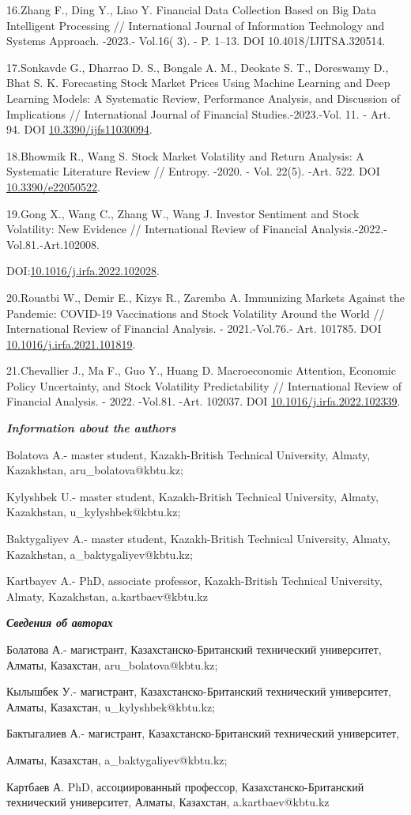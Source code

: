 \documentclass[
]{article}
\begin{document}
16.Zhang F., Ding Y., Liao Y. Financial Data Collection Based on Big
Data Intelligent Processing // International Journal of Information
Technology and Systems Approach. -2023.- Vol.16( 3). - P. 1--13. DOI
10.4018/IJITSA.320514.

17.Sonkavde G., Dharrao D. S., Bongale A. M., Deokate S. T., Doreswamy
D., Bhat S. K. Forecasting Stock Market Prices Using Machine Learning
and Deep Learning Models: A Systematic Review, Performance Analysis, and
Discussion of Implications // International Journal of Financial
Studies.-2023.-Vol. 11. - Art. 94. DOI
\href{https://doi.org/10.3390/ijfs11030094}{10.3390/ijfs11030094}.

18.Bhowmik R., Wang S. Stock Market Volatility and Return Analysis: A
Systematic Literature Review // Entropy. -2020. - Vol. 22(5). -Art. 522.
DOI \href{https://doi.org/10.3390/e22050522}{10.3390/e22050522}.

19.Gong X., Wang C., Zhang W., Wang J. Investor Sentiment and Stock
Volatility: New Evidence // International Review of Financial
Analysis.-2022.-Vol.81.-Art.102008.

DOI:\href{http://dx.doi.org/10.1016/j.irfa.2022.102028}{10.1016/j.irfa.2022.102028}.

20.Rouatbi W., Demir E., Kizys R., Zaremba A. Immunizing Markets Against
the Pandemic: COVID-19 Vaccinations and Stock Volatility Around the
World // International Review of Financial Analysis. - 2021.-Vol.76.-
Art. 101785. DOI
\href{https://doi.org/10.1016/j.irfa.2021.101819}{10.1016/j.irfa.2021.101819}.

21.Chevallier J., Ma F., Guo Y., Huang D. Macroeconomic Attention,
Economic Policy Uncertainty, and Stock Volatility Predictability //
International Review of Financial Analysis. - 2022. -Vol.81. -Art.
102037. DOI
\href{https://doi.org/10.1016/j.irfa.2022.102339}{10.1016/j.irfa.2022.102339}.

\emph{\textbf{Information about the authors}}

Bolatova A.- master student, Kazakh-British Technical University,
Almaty, Kazakhstan, aru\_bolatova@kbtu.kz;

Kylyshbek U.- master student, Kazakh-British Technical University,
Almaty, Kazakhstan, u\_kylyshbek@kbtu.kz;

Baktygaliyev A.- master student, Kazakh-British Technical University,
Almaty, Kazakhstan, a\_baktygaliyev@kbtu.kz;

Kartbayev A.- PhD, associate professor, Kazakh-British Technical
University, Almaty, Kazakhstan, a.kartbaev@kbtu.kz

\emph{\textbf{Сведения об авторах}}

Болатова А.- магистрант, Казахстанско-Британский технический
университет, Алматы, Казахстан, aru\_bolatova@kbtu.kz;

Кылышбек У.- магистрант, Казахстанско-Британский технический
университет, Алматы, Казахстан, u\_kylyshbek@kbtu.kz;

Бактыгалиев А.- магистрант, Казахстанско-Британский технический
университет,

Алматы, Казахстан, a\_baktygaliyev@kbtu.kz;

Картбаев А. PhD, ассоциированный профессор, Казахстанско-Британский
технический университет, Алматы, Казахстан, a.kartbaev@kbtu.kz
\end{document}
